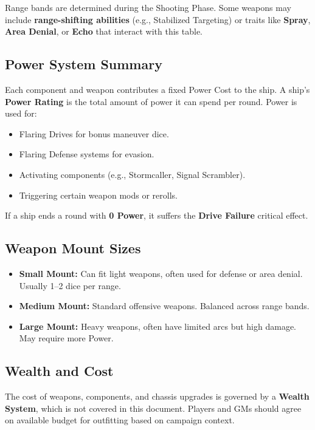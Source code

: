 \documentclass[11pt]{article}
\begin{document}
Range bands are determined during the Shooting Phase. Some weapons may include \textbf{range-shifting abilities} (e.g., Stabilized Targeting) or traits like \textbf{Spray}, \textbf{Area Denial}, or \textbf{Echo} that interact with this table.

\subsection{Power System Summary}

Each component and weapon contributes a fixed Power Cost to the ship. A ship’s \textbf{Power Rating} is the total amount of power it can spend per round. Power is used for:

\begin{itemize}
    \item Flaring Drives for bonus maneuver dice.
    \item Flaring Defense systems for evasion.
    \item Activating components (e.g., Stormcaller, Signal Scrambler).
    \item Triggering certain weapon mods or rerolls.
\end{itemize}

If a ship ends a round with \textbf{0 Power}, it suffers the \textbf{Drive Failure} critical effect.

\subsection{Weapon Mount Sizes}

\begin{itemize}
    \item \textbf{Small Mount:} Can fit light weapons, often used for defense or area denial. Usually 1–2 dice per range.
    \item \textbf{Medium Mount:} Standard offensive weapons. Balanced across range bands.
    \item \textbf{Large Mount:} Heavy weapons, often have limited arcs but high damage. May require more Power.
\end{itemize}

\subsection{Wealth and Cost}

The cost of weapons, components, and chassis upgrades is governed by a \textbf{Wealth System}, which is not covered in this document. Players and GMs should agree on available budget for outfitting based on campaign context.
\end{document}
